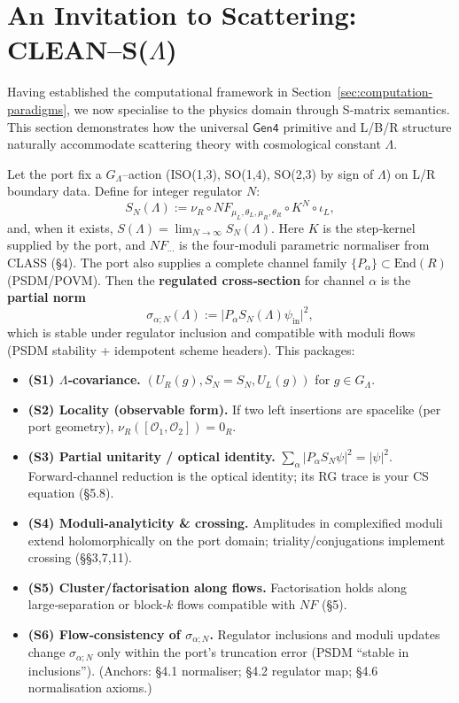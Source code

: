 \section{An Invitation to Scattering: CLEAN–S($\Lambda$)}
\label{sec:scattering-invitation}

Having established the computational framework in Section~\ref{sec:computation-paradigms}, we now specialise to the physics domain through S-matrix semantics. This section demonstrates how the universal $\mathsf{Gen4}$ primitive and L/B/R structure naturally accommodate scattering theory with cosmological constant $\Lambda$.

Let the port fix a $G_\Lambda$–action (ISO(1,3), SO(1,4), SO(2,3) by sign of $\Lambda$) on L/R boundary data. Define for integer regulator $N$:
\[
\boxed{S_N(\Lambda) := \nu_R \circ NF_{\mu_L,\theta_L,\mu_R,\theta_R} \circ K^N \circ \iota_L,}
\]
and, when it exists, $S(\Lambda)=\lim_{N\to\infty}S_N(\Lambda)$. Here $K$ is the step‑kernel supplied by the port, and $NF_{\cdots}$ is the four‑moduli parametric normaliser from CLASS (§4). The port also supplies a complete channel family $\{P_\alpha\}\subset\mathrm{End}(R)$ (PSDM/POVM). Then the \textbf{regulated cross‑section} for channel $\alpha$ is the \textbf{partial norm}
\[
\boxed{\sigma_{\alpha;N}(\Lambda) := \big|P_\alpha S_N(\Lambda) \psi_{\mathrm{in}}\big|^2,}
\]
which is stable under regulator inclusion and compatible with moduli flows (PSDM stability + idempotent scheme headers). This packages:

\begin{itemize}
\item \textbf{(S1) $\Lambda$‑covariance.} $(U_R(g),S_N=S_N,U_L(g))$ for $g\in G_\Lambda$.
\item \textbf{(S2) Locality (observable form).} If two left insertions are spacelike (per port geometry), $\nu_R([\mathcal O_1,\mathcal O_2])=0_R$.
\item \textbf{(S3) Partial unitarity / optical identity.} $\sum_\alpha|P_\alpha S_N\psi|^2=|\psi|^2$. Forward‑channel reduction is the optical identity; its RG trace is your CS equation (§5.8).
\item \textbf{(S4) Moduli‑analyticity \& crossing.} Amplitudes in complexified moduli extend holomorphically on the port domain; triality/conjugations implement crossing (§§3,7,11).
\item \textbf{(S5) Cluster/factorisation along flows.} Factorisation holds along large‑separation or block‑$k$ flows compatible with $NF$ (§5).
\item \textbf{(S6) Flow‑consistency of $\sigma_{\alpha;N}$.} Regulator inclusions and moduli updates change $\sigma_{\alpha;N}$ only within the port's truncation error (PSDM ``stable in inclusions''). (Anchors: §4.1 normaliser; §4.2 regulator map; §4.6 normalisation axioms.)
\end{itemize}

